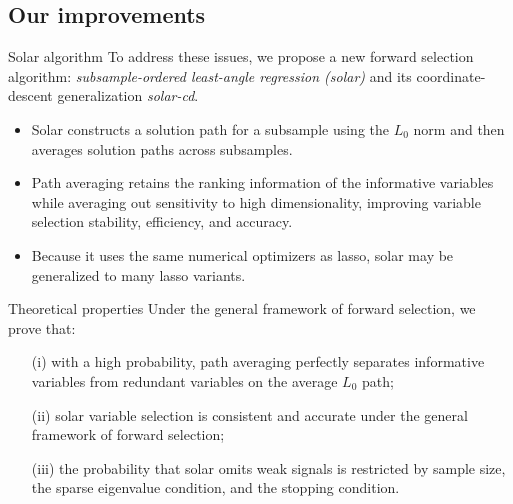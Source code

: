 \documentclass{beamer}
\begin{document}
\subsection{Our improvements}

\begin{frame}{Solar algorithm}
  To address these issues, we propose a new forward selection algorithm: \emph{subsample-ordered least-angle regression (solar)} and its coordinate-descent generalization \emph{solar-cd}.

  \begin{itemize}  
    \item Solar constructs a solution path for a subsample using the $L_0$ norm and then averages solution paths across subsamples.
     
    \item Path averaging retains the ranking information of the informative variables while averaging out sensitivity to high dimensionality, improving variable selection stability, efficiency, and accuracy. 
    
    \item Because it uses the same numerical optimizers as lasso, solar may be generalized to many lasso variants.
  \end{itemize}
\end{frame}


\begin{frame}{Theoretical properties}
  Under the \citet{zhang09} general framework of forward selection, we prove that:

  \begin{itemize}  
    \item  [(i)] with a high probability, path averaging perfectly separates informative variables from redundant variables on the average $L_0$ path; 
    
    \item  [(ii)] solar variable selection is consistent and accurate under the general framework of forward selection; 
    
    \item  [(iii)] the probability that solar omits weak signals is restricted by sample size, the sparse eigenvalue condition, and the stopping condition.
  \end{itemize}
\end{frame}
\end{document}
